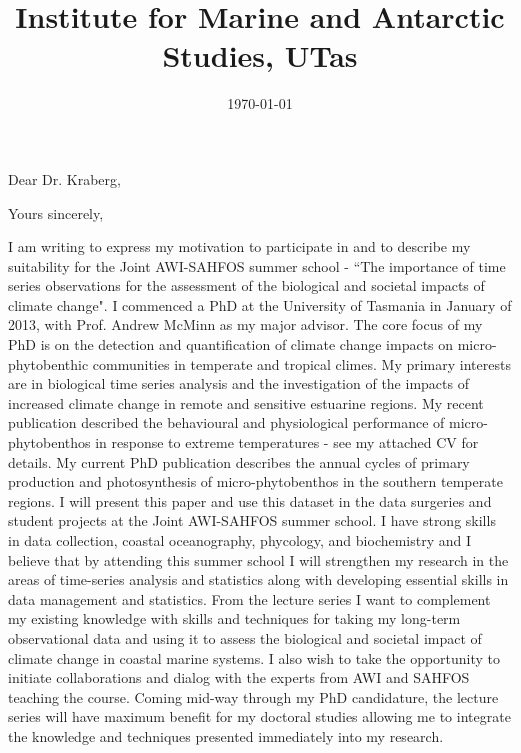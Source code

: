 \documentclass[11pt,a4paper,sans]{moderncv}        %
\title{Institute for Marine and Antarctic Studies, UTas}                               %
\begin{document}
\date{\today}
\opening{Dear Dr. Kraberg,}
\closing{Yours sincerely,}
\makelettertitle
I am writing to express my motivation to participate in and to describe my suitability for the Joint AWI-SAHFOS summer school - ``The importance of time series observations for the assessment of the biological and societal impacts of climate change". \linebreak\newline
I commenced a PhD at the University of Tasmania in January of 2013, with Prof. Andrew McMinn as my major advisor. The core focus of my PhD is on the detection and quantification of climate change impacts on micro-phytobenthic communities in temperate and tropical climes. My primary interests are in biological time series analysis and the investigation of the impacts of increased climate change in remote and sensitive estuarine regions.  \linebreak\newline
My recent publication described the behavioural and physiological performance of micro-phytobenthos in response to extreme temperatures - see my attached CV for details. My current PhD publication describes the annual cycles of primary production and photosynthesis of micro-phytobenthos in the southern temperate regions. I will present this paper and use this dataset in the data surgeries and student projects at the Joint AWI-SAHFOS summer school.  \linebreak\newline
I have strong skills in data collection, coastal oceanography, phycology, and biochemistry and I believe that by attending this summer school I will strengthen my research in the areas of time-series analysis and statistics along with developing essential skills in data management and statistics. \linebreak\newline
From the lecture series I want to complement my existing knowledge with skills and techniques for taking my long-term observational data and using it to assess the biological and societal impact of climate change in coastal marine systems. I also wish to take the opportunity to initiate collaborations and dialog with the experts from AWI and SAHFOS teaching the course. \linebreak\newline
Coming mid-way through my PhD candidature, the lecture series will have maximum benefit for my doctoral studies allowing me to integrate the knowledge and techniques presented immediately into my research. \linebreak\newline
\makeletterclosing
\end{document}
